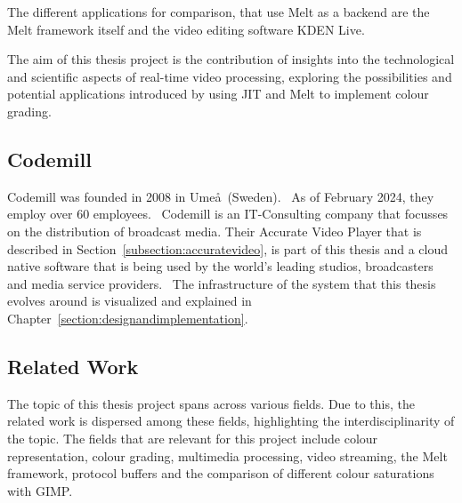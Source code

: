 \documentclass[../MasterThesis.tex]{subfiles}
\begin{document}
	The different applications for comparison, that use Melt as a backend are the Melt framework itself and the video editing software KDEN Live. 
	
	
	The aim of this thesis project is the contribution of insights into the technological and scientific aspects of real-time video processing, exploring the possibilities and potential applications introduced by using JIT and Melt to implement colour grading. 
	
	
	
	
	
	
\newpage	
	\subsection{Codemill} \label{subsection:codemill}
	
	Codemill was founded in 2008 in Ume\aa \ (Sweden).~\cite{codemill_now, codemill_old}
	As of February 2024, they employ over 60 employees.~\cite{codemill} 
	Codemill is an IT-Consulting company that focusses on the distribution of broadcast media. Their Accurate Video Player that is described in Section~\ref{subsection:accuratevideo}, is part of this thesis and a cloud native software that is being used by the world's leading studios, broadcasters and media service providers.~\cite{codemill_linkedin, codemill_avp}
	The infrastructure of the system that this thesis evolves around is visualized and explained in Chapter~\ref{section:designandimplementation}.
	
	
	
	
	
	
	
	
	
	
	
	
	\subsection{Related Work} \label{subsection:relatedwork}
	
	The topic of this thesis project spans across various fields. 
	Due to this, the related work is dispersed among these fields, highlighting the interdisciplinarity of the topic.
	The fields that are relevant for this project include colour representation, colour grading, multimedia processing, video streaming, the Melt framework, protocol buffers and the comparison of different colour saturations with GIMP.
\end{document}
